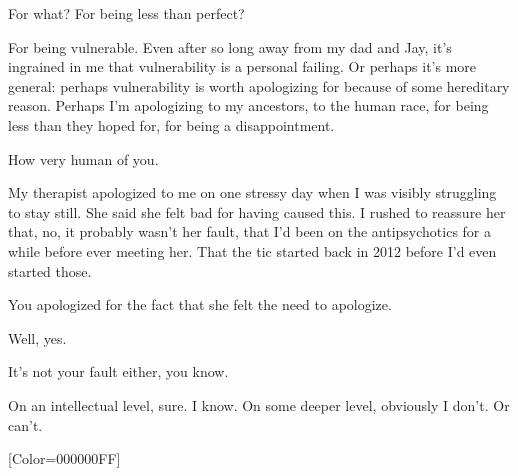 \begin{paracol}{2}
\begin{leftcolumn}
\begin{ally}
For what? For being less than perfect?
\end{ally}
For being vulnerable. Even after so long away from my dad and Jay, it's ingrained in me that vulnerability is a personal failing. Or perhaps it's more general: perhaps vulnerability is worth apologizing for because of some hereditary reason. Perhaps I'm apologizing to my ancestors, to the human race, for being less than they hoped for, for being a disappointment.

\begin{ally}
How very human of you.
\end{ally}
My therapist apologized to me on one stressy day when I was visibly struggling to stay still. She said she felt bad for having caused this. I rushed to reassure her that, no, it probably wasn't her fault, that I'd been on the antipsychotics for a while before ever meeting her. That the tic started back in 2012 before I'd even started those.

\begin{ally}
You apologized for the fact that she felt the need to apologize.
\end{ally}
Well, yes.

\begin{ally}
It's not your fault either, you know.
\end{ally}
On an intellectual level, sure. I know. On some deeper level, obviously I don't. Or can't.
\newpage
\end{leftcolumn}
\end{paracol}
\resetbackgroundcolor

\renewfontfamily{}[Color=000000FF]
